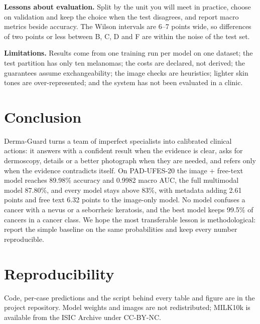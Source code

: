 \documentclass[conference]{IEEEtran}
\begin{document}
\textbf{Lessons about evaluation.} Split by the unit you will meet in practice, choose on validation and keep the choice when the test disagrees, and report macro metrics beside accuracy. The Wilson intervals are 6--7 points wide, so differences of two points or less between B, C, D and F are within the noise of the test set.

\textbf{Limitations.} Results come from one training run per model on one dataset; the test partition has only ten melanomas; the costs are declared, not derived; the guarantees assume exchangeability; the image checks are heuristics; lighter skin tones are over-represented; and the system has not been evaluated in a clinic.

\section{Conclusion}
Derma-Guard turns a team of imperfect specialists into calibrated clinical actions: it answers with a confident result when the evidence is clear, asks for dermoscopy, details or a better photograph when they are needed, and refers only when the evidence contradicts itself. On PAD-UFES-20 the image + free-text model reaches 89.98\% accuracy and 0.9982 macro AUC, the full multimodal model 87.80\%, and every model stays above 83\%, with metadata adding 2.61 points and free text 6.32 points to the image-only model. No model confuses a cancer with a nevus or a seborrheic keratosis, and the best model keeps 99.5\% of cancers in a cancer class. We hope the most transferable lesson is methodological: report the simple baseline on the same probabilities and keep every number reproducible.


\section*{Reproducibility}
Code, per-case predictions and the script behind every table and figure are in the project repository. Model weights and images are not redistributed; MILK10k is available from the ISIC Archive under CC-BY-NC.
\end{document}
